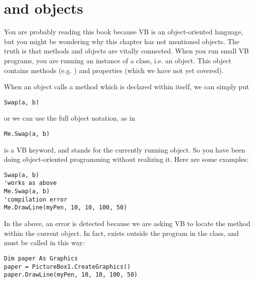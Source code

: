 	\section{ and objects}
		You are probably reading this book because VB is an object-oriented language, but you might be wondering why this chapter has not mentioned objects. The truth is that methods and objects are vitally connected. When you run small VB programs, you are running an instance of a class, i.e. an object. This object contains methods (e.g. ) and properties (which we have not yet covered).

		When an object calls a method which is declared within itself, we can simply put
		\begin{lstlisting}
Swap(a, b)
		\end{lstlisting}
		or we can use the full object notation, as in
		\begin{lstlisting}
Me.Swap(a, b)
		\end{lstlisting}
		 is a VB keyword, and stands for the currently running object. So you have been doing object-oriented programming without realizing it. Here are some examples:
		\begin{lstlisting}
Swap(a, b)
'works as above
Me.Swap(a, b)
'compilation error
Me.DrawLine(myPen, 10, 10, 100, 50)
		\end{lstlisting}
		In the above, an error is detected because we are asking VB to locate the  method within the current object. In fact,  exists outside the program in the  class, and must be called in this way:
		\begin{lstlisting}
Dim paper As Graphics
paper = PictureBox1.CreateGraphics()
paper.DrawLine(myPen, 10, 10, 100, 50)
		\end{lstlisting}



